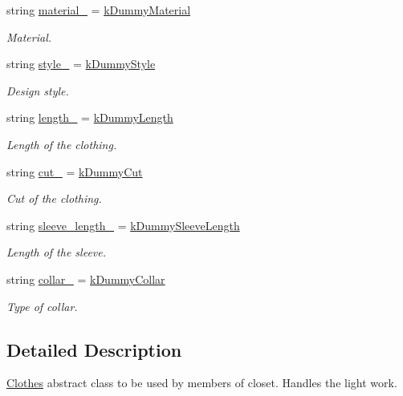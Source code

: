 \begin{DoxyCompactItemize}
string \mbox{\hyperlink{classClothes_adbb9ed311f14ccbb1e4fe0e8378a95d4}{material\+\_\+}} = \mbox{\hyperlink{clothes_8h_a9df1268c6668ae4e2a728ccf032cc33d}{k\+Dummy\+Material}}
\begin{DoxyCompactList}\small\item\em Material. \end{DoxyCompactList}\item 
string \mbox{\hyperlink{classClothes_aa85ed2b95110d8c477a1aca9cb403f98}{style\+\_\+}} = \mbox{\hyperlink{clothes_8h_a9deec6ed1f40928bfa0040eeab95ed6b}{k\+Dummy\+Style}}
\begin{DoxyCompactList}\small\item\em Design style. \end{DoxyCompactList}\item 
string \mbox{\hyperlink{classClothes_ae02603eda727e33caf46ec30e761e3c3}{length\+\_\+}} = \mbox{\hyperlink{clothes_8h_a1624256dcecfb0995a74c36142593770}{k\+Dummy\+Length}}
\begin{DoxyCompactList}\small\item\em Length of the clothing. \end{DoxyCompactList}\item 
string \mbox{\hyperlink{classClothes_ac1c2286c8928a5eee91d818a098a44ac}{cut\+\_\+}} = \mbox{\hyperlink{clothes_8h_a8a6eb066049b009439505355aeaae375}{k\+Dummy\+Cut}}
\begin{DoxyCompactList}\small\item\em Cut of the clothing. \end{DoxyCompactList}\item 
string \mbox{\hyperlink{classClothes_a012aeb71e62ebaf9b5b5dd700cc8d5db}{sleeve\+\_\+length\+\_\+}} = \mbox{\hyperlink{clothes_8h_a0f53dde6a2c4c344bb7da50655497350}{k\+Dummy\+Sleeve\+Length}}
\begin{DoxyCompactList}\small\item\em Length of the sleeve. \end{DoxyCompactList}\item 
string \mbox{\hyperlink{classClothes_ae2e5026257b3a2f2ddbf61757fd3b57b}{collar\+\_\+}} = \mbox{\hyperlink{clothes_8h_ac06c9f556f68bcd2829e36c55b70a86e}{k\+Dummy\+Collar}}
\begin{DoxyCompactList}\small\item\em Type of collar. \end{DoxyCompactList}\end{DoxyCompactItemize}


\subsection{Detailed Description}
\mbox{\hyperlink{classClothes}{Clothes}} abstract class to be used by members of closet. Handles the light work. 

